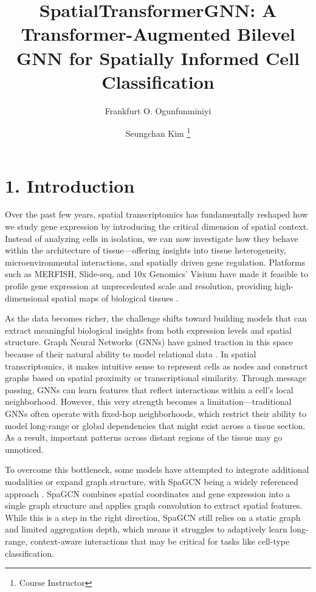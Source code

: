 \documentclass[unnumsec,webpdf,contemporary,medium]{oup-authoring-template}
\title[SpatialTransformerGNN]{SpatialTransformerGNN: A Transformer-Augmented Bilevel GNN for Spatially Informed Cell Classification}
\author[1,*]{Frankfurt O. Ogunfunminiyi}
\author[1]{Seungchan Kim  \thanks{Course Instructor}}
\begin{document}
\maketitle
\thispagestyle{fancy}
\section*{1. Introduction}

Over the past few years, spatial transcriptomics has fundamentally reshaped how we study gene expression by introducing the critical dimension of spatial context. Instead of analyzing cells in isolation, we can now investigate how they behave within the architecture of tissue—offering insights into tissue heterogeneity, microenvironmental interactions, and spatially driven gene regulation. Platforms such as MERFISH, Slide-seq, and 10x Genomics' Visium have made it feasible to profile gene expression at unprecedented scale and resolution, providing high-dimensional spatial maps of biological tissues \cite{chen2015merfish,rodriques2019slideseq,10xvisium}.

As the data becomes richer, the challenge shifts toward building models that can extract meaningful biological insights from both expression levels and spatial structure. Graph Neural Networks (GNNs) have gained traction in this space because of their natural ability to model relational data \cite{spagcn}. In spatial transcriptomics, it makes intuitive sense to represent cells as nodes and construct graphs based on spatial proximity or transcriptional similarity. Through message passing, GNNs can learn features that reflect interactions within a cell's local neighborhood. However, this very strength becomes a limitation—traditional GNNs often operate with fixed-hop neighborhoods, which restrict their ability to model long-range or global dependencies that might exist across a tissue section. As a result, important patterns across distant regions of the tissue may go unnoticed.

To overcome this bottleneck, some models have attempted to integrate additional modalities or expand graph structure, with SpaGCN being a widely referenced approach \cite{spagcn}. SpaGCN combines spatial coordinates and gene expression into a single graph structure and applies graph convolution to extract spatial features. While this is a step in the right direction, SpaGCN still relies on a static graph and limited aggregation depth, which means it struggles to adaptively learn long-range, context-aware interactions that may be critical for tasks like cell-type classification.
\end{document}
